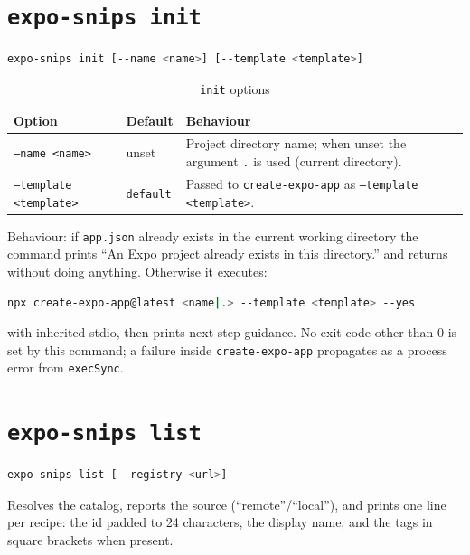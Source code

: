 \section{\texttt{expo-snips init}}

\begin{lstlisting}[language=bash]
expo-snips init [--name <name>] [--template <template>]
\end{lstlisting}

\begin{longtable}{p{2.6cm}p{1.6cm}p{10.4cm}}
\caption{\texttt{init} options}\\
\toprule
\textbf{Option} & \textbf{Default} & \textbf{Behaviour} \\
\midrule

\texttt{--name <name>} & unset & Project directory name; when unset the argument
\texttt{.} is used (current directory). \\
\texttt{--template <template>} & \texttt{default} & Passed to
\texttt{create-expo-app} as \texttt{--template <template>}. \\
\bottomrule
\end{longtable}

Behaviour: if \texttt{app.json} already exists in the current working directory the
command prints ``An Expo project already exists in this directory.'' and returns
without doing anything. Otherwise it executes:

\begin{lstlisting}[language=bash]
npx create-expo-app@latest <name|.> --template <template> --yes
\end{lstlisting}

with inherited stdio, then prints next-step guidance. No exit code other than 0 is
set by this command; a failure inside \texttt{create-expo-app} propagates as a
process error from \texttt{execSync}.

\section{\texttt{expo-snips list}}

\begin{lstlisting}[language=bash]
expo-snips list [--registry <url>]
\end{lstlisting}

Resolves the catalog, reports the source (``remote''/``local''), and prints one
line per recipe: the id padded to 24 characters, the display name, and the tags in
square brackets when present.

